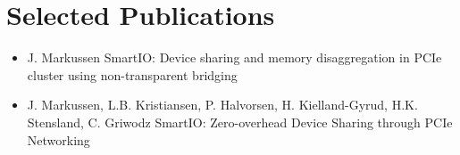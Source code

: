 \section{Selected Publications}
\begin{itemize}
    \item {}
        {J. Markussen}
        {SmartIO: Device sharing and memory disaggregation in PCIe cluster using non-transparent bridging}

    \item {}
		{J. Markussen, L.B. Kristiansen, P. Halvorsen, H. Kielland-Gyrud, H.K. Stensland, C. Griwodz}
		{SmartIO: Zero-overhead Device Sharing through PCIe Networking}

%	
%
%
\end{itemize}
